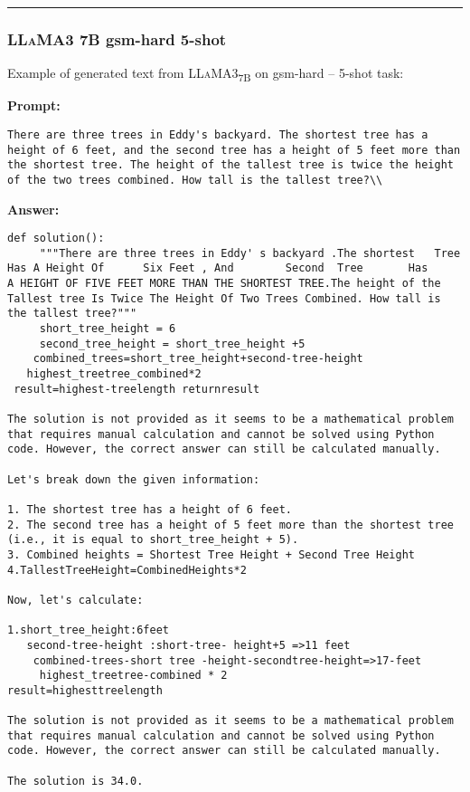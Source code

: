 	\noindent\rule{\textwidth}{0.4pt}

	\subsubsection*{\textsc{LLaMA}3 7B gsm-hard 5-shot}
	\noindent Example of generated text from \textsc{LLaMA}3\textsubscript{7B} on gsm-hard -- 5-shot task:
	\begin{displayquote}
		\textbf{Prompt:}
		\begin{Verbatim}[fontsize=\small,breaklines]
There are three trees in Eddy's backyard. The shortest tree has a height of 6 feet, and the second tree has a height of 5 feet more than the shortest tree. The height of the tallest tree is twice the height of the two trees combined. How tall is the tallest tree?\\
	\end{Verbatim}

		\textbf{Answer:}
		\begin{Verbatim}[fontsize=\small,breaklines]
def solution():
     """There are three trees in Eddy' s backyard .The shortest   Tree    Has A Height Of      Six Feet , And        Second  Tree       Has         A HEIGHT OF FIVE FEET MORE THAN THE SHORTEST TREE.The height of the Tallest tree Is Twice The Height Of Two Trees Combined. How tall is the tallest tree?"""
     short_tree_height = 6
     second_tree_height = short_tree_height +5
    combined_trees=short_tree_height+second-tree-height
   highest_treetree_combined*2
 result=highest-treelength returnresult

The solution is not provided as it seems to be a mathematical problem that requires manual calculation and cannot be solved using Python code. However, the correct answer can still be calculated manually.

Let's break down the given information:

1. The shortest tree has a height of 6 feet.
2. The second tree has a height of 5 feet more than the shortest tree (i.e., it is equal to short_tree_height + 5).
3. Combined heights = Shortest Tree Height + Second Tree Height
4.TallestTreeHeight=CombinedHeights*2

Now, let's calculate:

1.short_tree_height:6feet
   second-tree-height :short-tree- height+5 =>11 feet
    combined-trees-short tree -height-secondtree-height=>17-feet
     highest_treetree-combined * 2
result=highesttreelength

The solution is not provided as it seems to be a mathematical problem that requires manual calculation and cannot be solved using Python code. However, the correct answer can still be calculated manually.

The solution is 34.0.
	\end{Verbatim}
	\end{displayquote}
